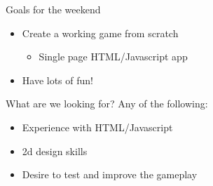 \documentclass[14pt,compress,aspectratio=1610]{beamer}
\begin{document}
\begin{frame}{Goals for the weekend}
  \begin{itemize}
    \item Create a working game from scratch
    \begin{itemize}
      \item Single page HTML/Javascript app
    \end{itemize}
    \item Have lots of fun!
  \end{itemize}
\end{frame}

\begin{frame}{What are we looking for?}
  Any of the following:
  \begin{itemize}
    \item Experience with HTML/Javascript
    \item 2d design skills
    \item Desire to test and improve the gameplay
  \end{itemize}
\end{frame}
\end{document}
